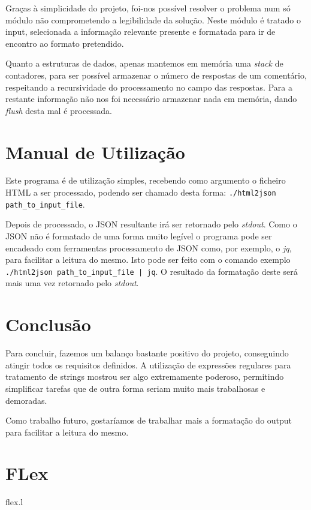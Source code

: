\documentclass[a4paper]{report}
\begin{document}
Graças à simplicidade do projeto, foi-nos possível resolver o problema num
só módulo não comprometendo a legibilidade da solução. Neste módulo é tratado
o input, selecionada a informação relevante presente e formatada para ir de
encontro ao formato pretendido.

Quanto a estruturas de dados, apenas mantemos em memória uma \textit{stack}
de contadores, para ser possível armazenar o número de respostas de um
comentário, respeitando a recursividade do processamento no campo das respostas.
Para a restante informação não nos foi necessário armazenar nada em memória,
dando \textit{flush} desta mal é processada.

\chapter{Manual de Utilização}

Este programa é de utilização simples, recebendo como argumento o ficheiro
HTML a ser processado, podendo ser chamado desta forma: 
\verb!./html2json path_to_input_file!.

Depois de processado, o JSON resultante irá ser retornado pelo \textit{stdout}.
Como o JSON não é formatado de uma forma muito legível o programa pode ser
encadeado com ferramentas processamento de JSON como, por exemplo, o \textit{jq},
para facilitar a leitura do mesmo. Isto pode ser feito com o comando exemplo
\verb!./html2json path_to_input_file | jq!. O resultado da formatação deste
será mais uma vez retornado pelo \textit{stdout}.

\chapter{Conclusão}

Para concluir, fazemos um balanço bastante positivo do projeto, conseguindo
atingir todos os requisitos definidos. A utilização de expressões regulares
para tratamento de strings mostrou ser algo extremamente poderoso, permitindo
simplificar tarefas que de outra forma seriam muito mais trabalhosas e demoradas.

Como trabalho futuro, gostaríamos de trabalhar mais a formatação do output
para facilitar a leitura do mesmo.

\appendix

\chapter{FLex}


{flex.l}
\end{document}
